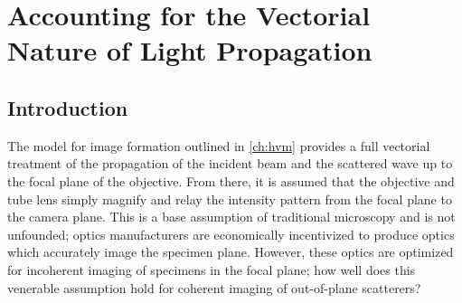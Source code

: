 \chapter{Accounting for the Vectorial Nature of Light Propagation}
\label{ch:debye}





\section{Introduction}





The model for image formation outlined in \autoref{ch:hvm} provides a full
vectorial treatment of the propagation of the incident beam and the scattered
wave up to the focal plane of the objective. From there, it is assumed that the
objective and tube lens simply magnify and relay the intensity pattern from
the focal plane to the camera plane.
This is a base assumption of traditional microscopy and is not unfounded; optics
manufacturers are economically incentivized to produce optics which accurately image
the specimen plane. However, these optics are optimized for incoherent imaging of
specimens in the focal plane;
how well does this venerable assumption hold for coherent imaging of out-of-plane
scatterers?

